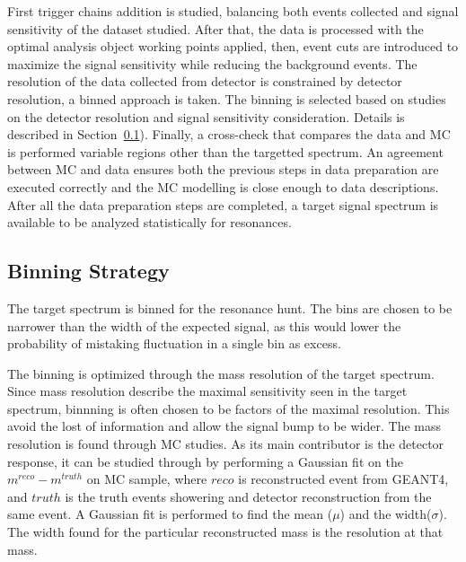 First trigger chains addition is studied, balancing both events collected and signal sensitivity of the dataset studied. After that, the data is processed with the optimal analysis object working points applied, then, event cuts are introduced to maximize the signal sensitivity while reducing the background events. The resolution of the data collected from detector is constrained by detector resolution, a binned approach is taken. The binning is selected based on studies on the detector resolution and signal sensitivity consideration. Details is described in Section~\ref{sec:binning}). Finally, a cross-check that compares the data and MC is performed variable regions other than the targetted spectrum. An agreement between MC and data ensures both the previous steps in data preparation are executed correctly and the MC modelling is close enough to data descriptions. After all the data preparation steps are completed, a target signal spectrum is available to be analyzed statistically for resonances. 

\subsection{Binning Strategy} 
\label{sec:binning}

The target spectrum is binned for the resonance hunt. The bins are chosen to be narrower than the width of the expected signal, as this would lower the probability of mistaking fluctuation in a single bin as excess.

The binning is optimized through the mass resolution of the target spectrum. Since mass resolution describe the maximal sensitivity seen in the target spectrum, binnning is often chosen to be factors of the maximal resolution. This avoid the lost of information and allow the signal bump to be wider. 
The mass resolution is found through MC studies. As its main contributor is the detector response, it can be studied through by performing a Gaussian fit on the $m^{reco}-m^{truth}$ on MC sample, where $reco$ is reconstructed event from GEANT4, and $truth$ is the truth events showering and detector reconstruction from the same event.
A Gaussian fit is performed to find the mean ($\mu$) and the width($\sigma$). The width found for the particular reconstructed mass is the resolution at that mass. 


